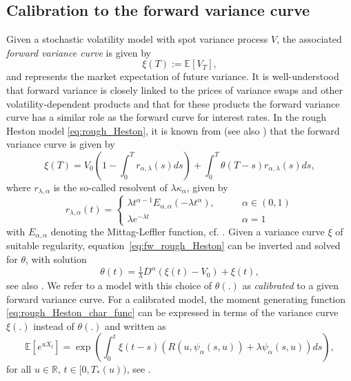 \documentclass[12pt,a4paper]{amsart}
\numberwithin{equation}{section}
\numberwithin{equation}{section}
\theoremstyle{nonumberplain}
\newcommand{\RR}{\mathbb{R}}
\newcommand{\EE}{\mathbb{E}}
\newcommand{\E}[1]{\mathbb{E}\left[#1\right]}                     %
\begin{document}
\subsection{Calibration to the forward variance curve}\label{sec:calibration}
Given a stochastic volatility model with spot variance process $V$, the associated \emph{forward variance curve} is given by
\begin{equation}
\xi(T) := \E{V_T},
\end{equation}
and represents the market expectation of future variance. It is well-understood that forward variance is closely linked to the prices of variance swaps and other volatility-dependent products and that for these products the forward variance curve has a similar role as the forward curve for interest rates. In the rough Heston model \eqref{eq:rough_Heston}, it is known from \cite[Prop.~3.1]{eleuch2018perfect} (see also \cite{keller-ressel2018affine}) that the forward variance curve is given by 
\begin{equation}\label{eq:fw_rough_Heston}
\xi(T) = V_0 \left(1 - \int_0^T r_{\alpha,\lambda}(s) ds\right) + \int_0^T \theta(T-s) r_{\alpha,\lambda}(s) ds,
\end{equation}
where $r_{\lambda,\alpha}$  is the so-called resolvent of $\lambda \kappa_\alpha$, given by
\begin{equation}\label{eq:resolvent}
r_{\lambda,\alpha}(t) = \begin{cases} \lambda t^{\alpha-1} E_{\alpha,\alpha}(-\lambda t^\alpha), &\qquad \alpha \in (0,1)\\ \lambda e^{-\lambda t} &\qquad \alpha=1\end{cases}
\end{equation}
with $E_{\alpha,\alpha}$ denoting the Mittag-Leffler function, cf. \cite{haubold2011mittag}. Given a variance curve $\xi$ of suitable regularity, equation~\eqref{eq:fw_rough_Heston} can be inverted and solved for $\theta$, with solution
\begin{equation}\label{eq:theta_calibrated}
\theta(t) = \tfrac{1}{\lambda} D^\alpha \left(\xi(t) - V_0\right) + \xi(t),
\end{equation}
see also \cite[Rem.~3.2]{eleuch2018perfect}. We refer to a model with this choice of $\theta(.)$ as \textit{calibrated} to a given forward variance curve. For a calibrated model, the moment generating function \eqref{eq:rough_Heston_char_func} can be expressed in terms of the variance curve $\xi(.)$ instead of $\theta(.)$ and written as
\begin{equation}\label{eq:mgf_alternative}
	\EE \left[ e^{u X_t} \right] = \exp \left(\int_0^t \xi(t-s) \left(R(u,\psi_\alpha(s,u)) + \lambda \psi_\alpha(s,u) \right) ds \right),
\end{equation}
for all $u \in \RR$, $t \in [0,T_*(u))$, see \cite{keller-ressel2018affine}. 
\end{document}

